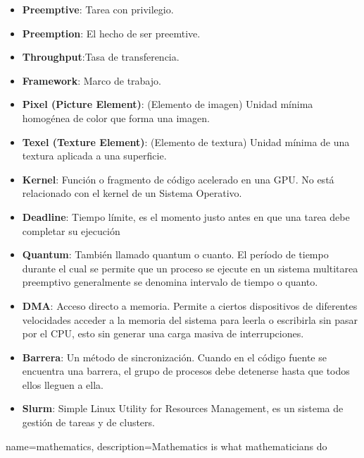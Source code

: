 \begin{itemize}
\item \textbf{Preemptive}: Tarea con privilegio.
\item \textbf{Preemption}: El hecho de ser preemtive.
\item \textbf{Throughput}:Tasa de transferencia.
\item \textbf{Framework}: Marco de trabajo.
\item \textbf{Pixel (Picture Element)}: (Elemento de imagen) Unidad mínima homogénea de color que forma una imagen.
\item \textbf{Texel (Texture Element)}: (Elemento de textura)  Unidad mínima de una textura aplicada a una superficie.
\item \textbf{Kernel}: Función o fragmento de código acelerado en una GPU. No está relacionado con el kernel de un Sistema Operativo.

\item \textbf{Deadline}: Tiempo límite, es el momento justo antes en que una tarea debe completar su ejecución

\item \textbf{Quantum}: También llamado quantum o cuanto. El período de tiempo durante el cual se permite que un proceso se ejecute en un sistema multitarea preemptivo generalmente se denomina intervalo de tiempo o quanto.


\item \textbf{DMA}: Acceso directo a memoria. Permite a ciertos dispositivos de diferentes velocidades acceder a la memoria del sistema para leerla o escribirla sin pasar por el CPU, esto sin generar una carga masiva de interrupciones.

\item \textbf{Barrera}: Un método de sincronización. Cuando en el código fuente se encuentra una barrera, el grupo de procesos debe detenerse hasta que todos ellos lleguen a ella.

\item \textbf{Slurm}: Simple Linux Utility for Resources Management, es un sistema de gestión de tareas y de clusters\cite{Slurm}.

\end{itemize}  
{
   name=mathematics,
    description={Mathematics is what mathematicians do}
}